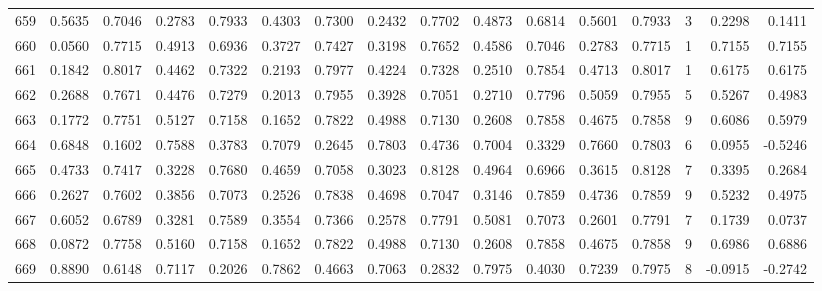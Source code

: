 \begin{tabular}{lrrrrrrrrrrrrrrr}
659 &      0.5635 &  0.7046 &  0.2783 &  0.7933 &  0.4303 &  0.7300 &  0.2432 &  0.7702 &  0.4873 &  0.6814 &   0.5601 &     0.7933 &      3 &                    0.2298 &                     0.1411 \\
660 &      0.0560 &  0.7715 &  0.4913 &  0.6936 &  0.3727 &  0.7427 &  0.3198 &  0.7652 &  0.4586 &  0.7046 &   0.2783 &     0.7715 &      1 &                    0.7155 &                     0.7155 \\
661 &      0.1842 &  0.8017 &  0.4462 &  0.7322 &  0.2193 &  0.7977 &  0.4224 &  0.7328 &  0.2510 &  0.7854 &   0.4713 &     0.8017 &      1 &                    0.6175 &                     0.6175 \\
662 &      0.2688 &  0.7671 &  0.4476 &  0.7279 &  0.2013 &  0.7955 &  0.3928 &  0.7051 &  0.2710 &  0.7796 &   0.5059 &     0.7955 &      5 &                    0.5267 &                     0.4983 \\
663 &      0.1772 &  0.7751 &  0.5127 &  0.7158 &  0.1652 &  0.7822 &  0.4988 &  0.7130 &  0.2608 &  0.7858 &   0.4675 &     0.7858 &      9 &                    0.6086 &                     0.5979 \\
664 &      0.6848 &  0.1602 &  0.7588 &  0.3783 &  0.7079 &  0.2645 &  0.7803 &  0.4736 &  0.7004 &  0.3329 &   0.7660 &     0.7803 &      6 &                    0.0955 &                    -0.5246 \\
665 &      0.4733 &  0.7417 &  0.3228 &  0.7680 &  0.4659 &  0.7058 &  0.3023 &  0.8128 &  0.4964 &  0.6966 &   0.3615 &     0.8128 &      7 &                    0.3395 &                     0.2684 \\
666 &      0.2627 &  0.7602 &  0.3856 &  0.7073 &  0.2526 &  0.7838 &  0.4698 &  0.7047 &  0.3146 &  0.7859 &   0.4736 &     0.7859 &      9 &                    0.5232 &                     0.4975 \\
667 &      0.6052 &  0.6789 &  0.3281 &  0.7589 &  0.3554 &  0.7366 &  0.2578 &  0.7791 &  0.5081 &  0.7073 &   0.2601 &     0.7791 &      7 &                    0.1739 &                     0.0737 \\
668 &      0.0872 &  0.7758 &  0.5160 &  0.7158 &  0.1652 &  0.7822 &  0.4988 &  0.7130 &  0.2608 &  0.7858 &   0.4675 &     0.7858 &      9 &                    0.6986 &                     0.6886 \\
669 &      0.8890 &  0.6148 &  0.7117 &  0.2026 &  0.7862 &  0.4663 &  0.7063 &  0.2832 &  0.7975 &  0.4030 &   0.7239 &     0.7975 &      8 &                   -0.0915 &                    -0.2742 \\

\end{tabular}
